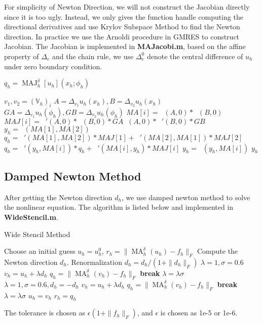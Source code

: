 \documentclass{article}
\DeclareMathOperator{\maxd}{\max\nolimits^\delta}
\DeclareMathOperator{\mind}{\min\nolimits^\delta}
\DeclareMathOperator{\MA}{MA}
\DeclareMathOperator{\MAJ}{MAJ}
\newcommand{\bV}{\mathbb V}
\begin{document}
For simplicity of Newton Direction, we will not construct the Jacobian directly since it is too ugly. Instead, we only gives the function handle computing the directional derivatives and use Krylov Subspace Method to find the Newton direction. In practice we use the Arnoldi procedure in GMRES to construct Jacobian. The Jacobian is implemented in \textbf{MAJacobi.m}, based on the affine property of $\Delta_e$ and the chain rule, we use $\Delta^0_e$ denote the central difference of $u_h$ under zero boundary condition.

\begin{algorithm}[H]
	\caption{$q_h = \MAJ_h^{\delta}[u_h](x_h; \phi_h)$}
	\begin{algorithmic}[1]
		\FOR{$i=1:|\bV_h|$}
		\STATE $v_1, v_2 = (\bV_h)_i$
		\STATE $A = \Delta_{v_1}u_h(x_h), B = \Delta_{v_2}u_h(x_h)$
		\STATE $GA = \Delta_{v_1}u_h(\phi_h), GB = \Delta_{v_2}u_h(\phi_h)$
		\STATE $MA[i] = \maxd(A,0)*\maxd(B,0)$
		\STATE $MAJ[i] =\maxd'(A,0)*\maxd(B,0)*GA \maxd(A,0)*\maxd'(B,0)*GB$
		\ENDFOR
		\STATE $y_h = \mind(MA[1], MA[2])$
		\STATE $q_h = \mind'(MA[1],MA[2])*MAJ[1] + \mind'(MA[2],MA[1])*MAJ[2]$
		\FOR{$i=3:|\bV_h|$}
		\STATE $q_h = \mind'(y_h, MA[i])*q_h + \mind'(MA[i],y_h)*MAJ[i]$
		\STATE $y_h = \mind(y_h, MA[i])$
		\ENDFOR
		\STATE \Return $y_h$
	\end{algorithmic}
\end{algorithm}
\subsection{Damped Newton Method}
After getting the Newton direction $d_h$, we use damped newton method to solve the nonlinear equation. The algorithm is listed below and implemented in \textbf{WideStencil.m}.

\begin{algorithm}[H]
	\caption{Wide Stencil Method}
	\begin{algorithmic}[1]
		\STATE Choose an initial guess $u_h = u_h^0$, $r_h = \|\MA_h^{\delta}(u_h) - f_h\|_F$
		\STATE Compute the Newton direction $d_h$.
		\STATE Renormalization $d_h = d_h/(1+\|d_h\|_F)$
		\STATE $\lambda = 1, \sigma = 0.6$
		\STATE $v_h = u_h + \lambda d_h$
		\STATE $q_h = \|\MA_h^{\delta}(v_h) - f_h\|_F$
		\STATE \textbf{break}
		\ENDIF
		\STATE $\lambda = \lambda\sigma$
		\ENDFOR
		\STATE $\lambda = 1, \sigma = 0.6, d_h = -d_h$
		\STATE $v_h = u_h + \lambda d_h$
		\STATE $q_h = \|\MA_h^{\delta}(v_h) - f_h\|_F$
		\STATE \textbf{break}
		\ENDIF
		\STATE $\lambda = \lambda\sigma$
		\ENDFOR
		\ENDIF
		\STATE $u_h = v_h$
		\STATE $r_h = q_h$
		\ENDWHILE
	\end{algorithmic}
\end{algorithm}
The tolerance is chosen as $\epsilon(1+\|f_h\|_F)$, and $\epsilon$ is chosen as 1e-5 or 1e-6.
\end{document}

